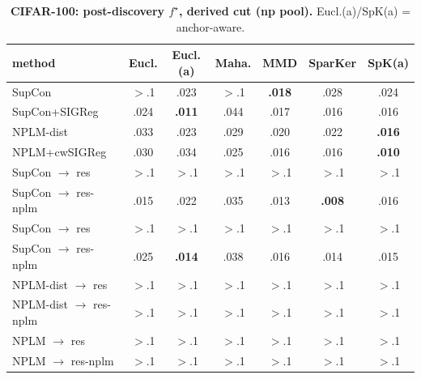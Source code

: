 \documentclass[10pt]{article}
\begin{document}
\begin{table}[t]
\centering
\footnotesize

\begin{tabular}{lcccccc}
\toprule
method & Eucl. & Eucl.(a) & Maha. & MMD & SparKer & SpK(a) \\
\midrule
SupCon & $>$.1 & .023 & $>$.1 & \textbf{.018} & .028 & .024 \\
SupCon+SIGReg & .024 & \textbf{.011} & .044 & .017 & .016 & .016 \\
NPLM-dist & .033 & .023 & .029 & .020 & .022 & \textbf{.016} \\
NPLM+cwSIGReg & .030 & .034 & .025 & .016 & .016 & \textbf{.010} \\
\quad SupCon $\to$ res & $>$.1 & $>$.1 & $>$.1 & $>$.1 & $>$.1 & $>$.1 \\
\quad SupCon $\to$ res-nplm & .015 & .022 & .035 & .013 & \textbf{.008} & .016 \\
\quad SupCon $\to$ res & $>$.1 & $>$.1 & $>$.1 & $>$.1 & $>$.1 & $>$.1 \\
\quad SupCon $\to$ res-nplm & .025 & \textbf{.014} & .038 & .016 & .014 & .015 \\
\quad NPLM-dist $\to$ res & $>$.1 & $>$.1 & $>$.1 & $>$.1 & $>$.1 & $>$.1 \\
\quad NPLM-dist $\to$ res-nplm & $>$.1 & $>$.1 & $>$.1 & $>$.1 & $>$.1 & $>$.1 \\
\quad NPLM $\to$ res & $>$.1 & $>$.1 & $>$.1 & $>$.1 & $>$.1 & $>$.1 \\
\quad NPLM $\to$ res-nplm & $>$.1 & $>$.1 & $>$.1 & $>$.1 & $>$.1 & $>$.1 \\
\bottomrule
\end{tabular}

\caption{\textbf{CIFAR-100: post-discovery $f^\star$, derived cut (np pool).} Eucl.(a)/SpK(a) = anchor-aware.}
\label{tab:CIFAR-100leg}
\end{table}
\end{document}
